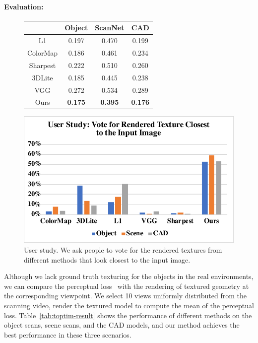 \paragraph*{Evaluation:}
\begin{figure}
\begin{minipage}{0.49\linewidth}
    \centering
    \begin{tabular}{|c|c|c|c|}
        \hline
        & Object & ScanNet & CAD\\
        \hline
        L1 & 0.197 & 0.470 & 0.199 \\
        \hline
        ColorMap & 0.186 & 0.461 & 0.234 \\
        \hline
        Sharpest & 0.222 & 0.510 & 0.260 \\
        \hline
        3DLite & 0.185 & 0.445 & 0.238 \\
        \hline
        VGG & 0.272 & 0.534 & 0.289 \\
        \hline
        Ours & \textbf{0.175} & \textbf{0.395} & \textbf{0.176} \\
        \hline
    \end{tabular}
    \label{tab:toptim-result}
\end{minipage}
\begin{minipage}{0.49\linewidth}
    \centering
    \includegraphics[width=0.8\linewidth]{texturegen/figures/user.pdf}
    \caption{User study. We ask people to vote for the rendered textures from different methods that look closest to the input image.}
    \label{fig:user-study}
\end{minipage}
\end{figure}
Although we lack ground truth texturing for the objects in the real environments, we can compare the perceptual loss~\cite{zhang2018unreasonable} with the rendering of textured geometry at the corresponding viewpoint. We select 10 views uniformly distributed from the scanning video, render the textured model to compute the mean of the perceptual loss.
Table~\ref{tab:toptim-result} shows the performance of different methods on the object scans, scene scans, and the CAD models, and our method achieves the best performance in these three scenarios.

